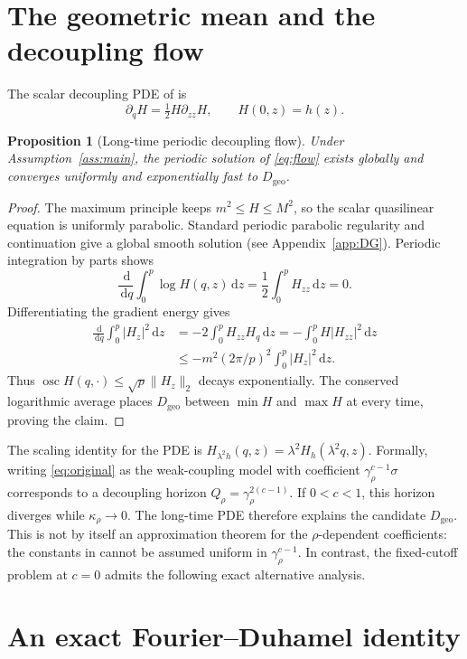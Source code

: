 \documentclass[11pt]{article}
\numberwithin{equation}{section}
\newtheorem{proposition}[theorem]{Proposition}
\theoremstyle{definition}
\theoremstyle{remark}
\newcommand{\dd}{\,\mathrm d}
\newcommand{\Geo}{D_{\mathrm{geo}}}
\newcommand{\osc}{\operatorname{osc}}
\begin{document}
\section{The geometric mean and the decoupling flow}\label{sec:flow}
The scalar decoupling PDE of \cite{DG} is
\begin{equation}\label{eq:flow}
 \partial_q H=\tfrac12 H\partial_{zz}H,\qquad H(0,z)=h(z).
\end{equation}
\begin{proposition}[Long-time periodic decoupling flow]\label{prop:geo}
Under Assumption~\ref{ass:main}, the periodic solution of \eqref{eq:flow} exists globally and converges uniformly and exponentially fast to $\Geo$.
\end{proposition}
\begin{proof}
The maximum principle keeps $m^2\le H\le M^2$, so the scalar quasilinear equation is uniformly parabolic. Standard periodic parabolic regularity and continuation give a global smooth solution (see Appendix~\ref{app:DG}). Periodic integration by parts shows
\[
 \frac{\dd}{\dd q}\int_0^p\log H(q,z)\dd z=\frac12\int_0^pH_{zz}\dd z=0.
\]
Differentiating the gradient energy gives
\begin{align*}
 \frac{\dd}{\dd q}\int_0^p|H_z|^2\dd z
 &=-2\int_0^p H_{zz}H_q\dd z=-\int_0^p H|H_{zz}|^2\dd z\\
 &\le-m^2(2\pi/p)^2\int_0^p|H_z|^2\dd z.
\end{align*}
Thus $\osc H(q,\cdot)\le\sqrt p\|H_z\|_2$ decays exponentially. The conserved logarithmic average places $\Geo$ between $\min H$ and $\max H$ at every time, proving the claim.
\end{proof}
The scaling identity for the PDE is $H_{\lambda^2h}(q,z)=\lambda^2 H_h(\lambda^2 q,z)$. Formally, writing \eqref{eq:original} as the weak-coupling model with coefficient $\gamma_\rho^{c-1}\sigma$ corresponds to a decoupling horizon $Q_\rho=\gamma_\rho^{2(c-1)}$. If $0<c<1$, this horizon diverges while $\kappa_\rho\to0$. The long-time PDE therefore explains the candidate $\Geo$. This is not by itself an approximation theorem for the $\rho$-dependent coefficients: the constants in \cite{DG} cannot be assumed uniform in $\gamma_\rho^{c-1}$. In contrast, the fixed-cutoff problem at $c=0$ admits the following exact alternative analysis.

\section{An exact Fourier--Duhamel identity}\label{sec:fourier}
\end{document}
